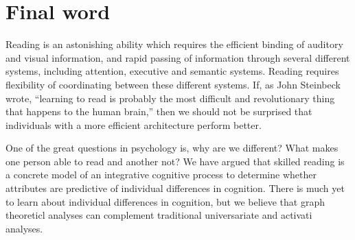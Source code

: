 \section{Final word}

Reading is an astonishing ability which requires the efficient binding of auditory and visual information, and rapid passing of information through several different systems, including attention, executive and semantic systems.  Reading requires flexibility of coordinating between these different systems. If, as John Steinbeck wrote, ``learning to read is probably the most difficult and revolutionary thing that happens to the human brain,'' then we should not be surprised that individuals with a more efficient architecture perform better. 

One of the great questions in psychology is, why are we different? What makes one person able to read and another not? We have argued that skilled reading is a concrete model of an integrative cognitive process to determine whether attributes are predictive of individual differences in cognition. There is much yet to learn about individual differences in cognition, but we believe that graph theoreticl analyses can complement traditional universariate and activati analyses. 